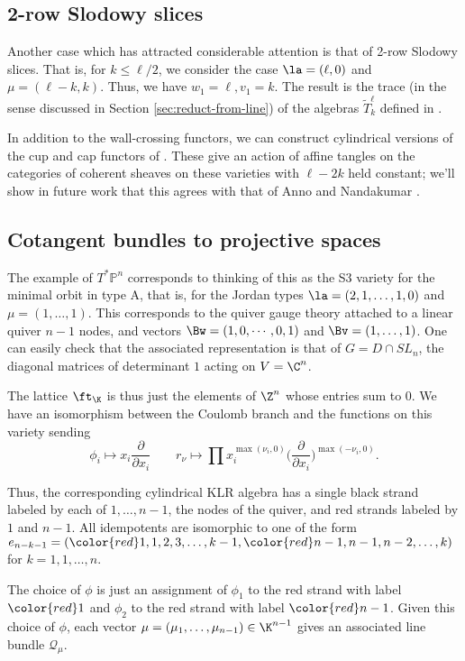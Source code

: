 \subsection{2-row Slodowy slices}

Another case which has attracted considerable attention is that of 2-row Slodowy slices.  That is, for $k\leq \ell/2$, we consider the case $\la=(\ell,0)$ and $\mu=(\ell-k,k)$.  Thus, we have $w_1=\ell,v_1=k$.  The result is the trace (in the sense discussed in Section \ref{sec:reduct-from-line}) of the algebras $\tilde{T}^\ell_k$ defined in \cite[Def. 2.3]{WebTGK}.

In addition to the wall-crossing functors, we can construct cylindrical versions of the cup and cap functors of \cite[Def. 2.3]{WebTGK}. These give an action of affine tangles on the categories of coherent sheaves on these varieties with $\ell-2k$ held constant; we'll show in future work that this agrees with that of Anno and Nandakumar \cite{ANexotic}.

\subsection{Cotangent bundles to projective spaces}
The example of $T^*\mathbb{P}^n$  corresponds to thinking of this as the S3 variety for the minimal orbit in type A, that is, for the Jordan types $\la=(2,1,\dots, 1,0)$ and $\mu=(1,\dots, 1)$.  This corresponds to the quiver gauge theory attached to a linear quiver $n-1$ nodes, and vectors $\Bw=(1,0,\cdots,0,1)$ and $\Bv=(1,\dots, 1)$. 
One can easily check that the associated representation is that of 
 $G=D\cap SL_n$, the diagonal matrices of determinant $1$ acting on $V=\C^n$.  
 
 
 The lattice $\ft_{\K}$ is thus just the elements of $\Z^n$ whose entries sum to 0.  We have an isomorphism between the Coulomb branch and the functions on this variety sending \[\phi_i\mapsto x_i\frac{\partial}{\partial x_i}\qquad r_{\nu}\mapsto \prod x_i^{\max(\nu_i,0)}\Big(\frac{\partial}{\partial x_i}\Big)^{\max(-\nu_i,0)}.\]


Thus, the corresponding cylindrical KLR algebra has a single black strand labeled by each of $1,\dots, n-1$, the nodes of the quiver, and red strands labeled by $1$ and $n-1$.  All idempotents are isomorphic to one of the form $e_{n-k-1}=({\color{red} 1}, 1,2,3,\dots, k-1, {\color{red} n-1}, n-1, n-2, \dots,k)$ for $k=1, 1,\dots, n$.

The choice of $\phi$ is just an assignment of $\phi_1$ to the red strand with label ${\color{red} 1}$ and $\phi_2$ to the red strand with label ${\color{red} n-1}$.  Given this choice of $\phi$, each vector   $\mu=(\mu_1,\dots, \mu_{n-1})\in \K^{n-1}$ gives an associated line bundle $\mathcal{Q}_\mu$.

